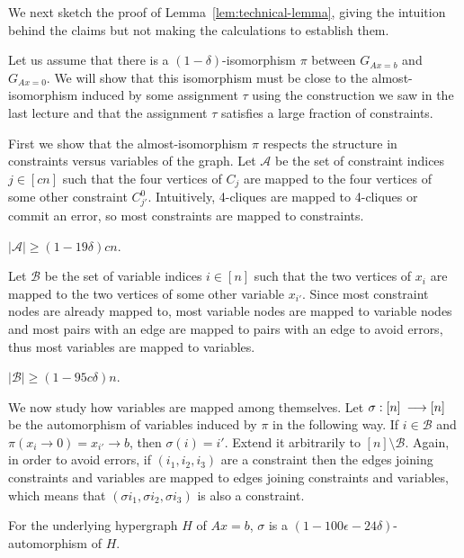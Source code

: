 \documentclass[a4paper,twoside,justified]{tufte-handout}
\newcommand{\Glin}[1]{G_{Ax=#1}}
\begin{document}
We next sketch the proof of Lemma~\ref{lem:technical-lemma}, giving the intuition behind the claims but not making the calculations to establish them.

Let us assume that there is a $(1-\delta)$-isomorphism $\pi$ between $\Glin{b}$ and $\Glin{0}$. We will show that this isomorphism must be close to the almost-isomorphism induced by some assignment $\tau$ using the construction we saw in the last lecture and that the assignment $\tau$ satisfies a large fraction of constraints.

First we show that the almost-isomorphism $\pi$ respects the structure in constraints versus variables of the graph.
Let $\mathcal{A}$ be the set of constraint indices $j\in[cn]$ such that the four vertices of $C_j$ are mapped to the four vertices of some other constraint $C_{j'}^0$. Intuitively, 4-cliques are mapped to 4-cliques or commit an error, so most constraints are mapped to constraints.

\begin{claim}
  \label{claim:constraints-map-to-constraints}
  $|\mathcal{A}| \geq (1-19\delta) c n$.
\end{claim}

Let $\mathcal{B}$ be the set of variable indices $i\in [n]$ such that the two vertices of $x_i$ are mapped to the two vertices of some other variable $x_{i'}$. Since most constraint nodes are already mapped to, most variable nodes are mapped to variable nodes and most pairs with an edge are mapped to pairs with an edge to avoid errors, thus most variables are mapped to variables.

\begin{claim}
  \label{claim:variables-map-to-variables}
  $|\mathcal{B}| \geq (1-95c\delta) n$.
\end{claim}

We now study how variables are mapped among themselves. Let $\sigma:[n]\:\longrightarrow [n]$ be the automorphism of variables induced by $\pi$ in the following way. If $i\in\mathcal{B}$ and $\pi(x_i\to0)=x_{i'}\to b$, then $\sigma(i)=i'$. Extend it arbitrarily to $[n]\setminus \mathcal{B}$. Again, in order to avoid errors, if $(i_1,i_2,i_3)$ are a constraint then the edges joining constraints and variables are mapped to edges 
joining constraints and variables, which means that $(\sigma i_1, \sigma i_2, \sigma i_3)$ is also a constraint.

\begin{claim}
  \label{claim:sigma-almost-automorphism}
  For the underlying hypergraph $H$ of $Ax=b$, $\sigma$ is a
  $(1-100\epsilon-24\delta)$-automorphism of $H$.
\end{claim}
\end{document}
